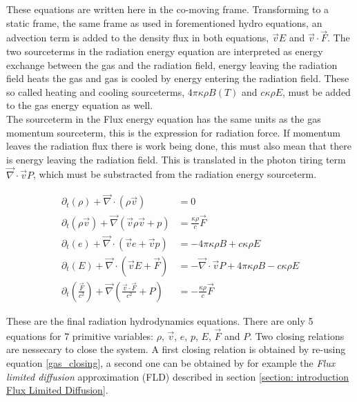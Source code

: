 These equations are written here in the co-moving frame. Transforming to a static frame, the same frame as used in forementioned hydro equations, an advection term is added to the density flux in  both equations, $\vec{v} E$ and $\vec{v} \cdot \vec{F}$. The two sourceterms in the radiation energy equation are interpreted as energy exchange between the gas and the radiation field, energy leaving the radiation field heats the gas and gas is cooled by energy entering the radiation field. These so called heating and cooling sourceterms, $4\pi \kappa\rho B(T)$ and $ c \kappa \rho E$, must be added to the gas energy equation as well. \\
The sourceterm in the Flux energy equation has the same units as the gas momentum sourceterm, this is the expression for radiation force. If momentum leaves the radiation flux there is work being done, this must also mean that there is energy leaving the radiation field. This is translated in the photon tiring term $\vec{\nabla} \cdot \vec{v} P$, which must be substracted from the radiation energy sourceterm.

\begin{align}
 \partial_t \left(\rho \right) + \vec{\nabla} \cdot \left( \rho \vec{v}  \right) &= 0 \label{eq: rhd_cont} \\
 \partial_t \left(\rho \vec{v} \right) + \vec{\nabla} \left( \vec{v} \rho \vec{v} + p \right) 
 &= \frac{\kappa \rho}{c} \vec{F} \label{eq: rhd_mom} \\
 \partial_t \left(e \right) + \vec{\nabla} \cdot \left( \vec{v} e + \vec{v} p \right) &= -4\pi \kappa\rho B + c \kappa \rho E \label{eq: rhd_e}\\
 \partial_t \left(E \right) +  \vec{\nabla} \cdot \left( \vec{v} E + \vec{F} \right) &=  -\vec{\nabla} \cdot \vec{v} P + 4\pi \kappa\rho B - c \kappa \rho E \label{eq: rhd_e_r} \\
 \partial_t \left(\frac{\vec{F}}{c^2} \right) +  \vec{\nabla} \left( \frac{\vec{v} \cdot \vec{F}}{c^2} + P \right) &= - \frac{\kappa \rho}{c} \vec{F} \label{eq: rhd_flux}
\end{align}

These are the final radiation hydrodynamics equations. There are only 5 equations for 7 primitive variables: $\rho$, $\vec{v}$, $e$, $p$, $E$, $\vec{F}$ and $P$. Two closing relations are nessecary to close the system. A first closing relation is obtained by re-using equation \eqref{gas_closing}, a second one can be obtained by for example the \emph{Flux limited diffusion} approximation (FLD) described in section \ref{section: introduction Flux Limited Diffusion}.

